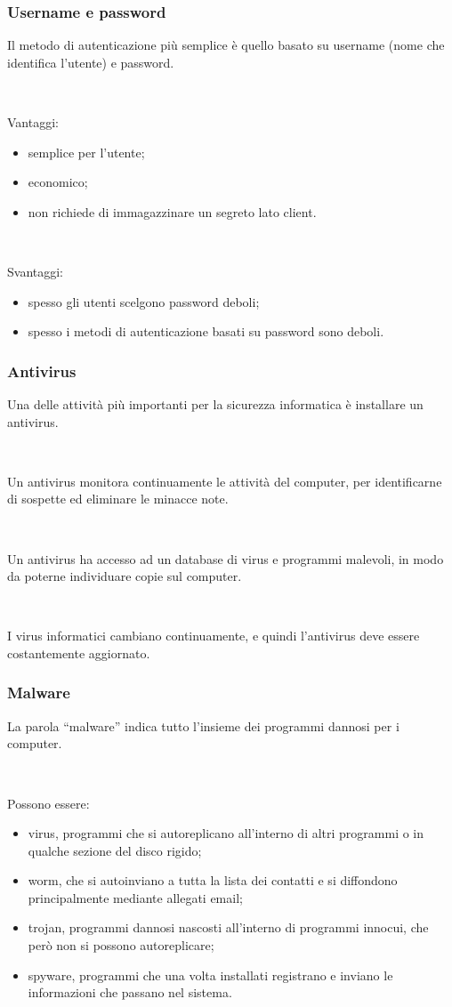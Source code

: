 \documentclass[]{beamer}
\begin{document}
\begin{frame}
\frametitle{Username e password}
Il metodo di autenticazione più semplice è quello basato su username (nome che identifica l'utente) e password.\pause

~


Vantaggi:
\begin{itemize}
  \item semplice per l’utente;
  \item economico;
  \item non richiede di immagazzinare un segreto lato client.
\end{itemize}\pause

~

Svantaggi:
\begin{itemize}
  \item spesso gli utenti scelgono password deboli;
  \item spesso i metodi di autenticazione basati su password sono deboli.
\end{itemize}
\end{frame}




\begin{frame}
\frametitle{Antivirus}
Una delle attività più importanti per la sicurezza informatica è \alert<1>{installare un antivirus}.\pause

~

Un antivirus monitora continuamente le attività del computer, per identificarne di sospette ed eliminare le minacce note.\pause

~

Un antivirus ha accesso ad un database di virus e programmi malevoli, in modo da poterne individuare copie sul computer.\pause

~

I virus informatici cambiano continuamente, e quindi l'antivirus deve essere \alert<4>{costantemente aggiornato}.
\end{frame}



\begin{frame}
\frametitle{Malware}
La parola ``malware'' indica tutto l'insieme dei programmi dannosi per i computer.{\pause}

~

Possono essere:
\begin{itemize}
   \item \alert<2>{virus}, programmi che si autoreplicano all'interno di altri programmi o in qualche sezione del disco rigido;\pause
   \item \alert<3>{worm}, che si autoinviano a tutta la lista dei contatti e si diffondono principalmente mediante allegati email;\pause
   \item \alert<4>{trojan}, programmi dannosi nascosti all'interno di programmi innocui, che però non si possono autoreplicare;\pause
   \item \alert<5>{spyware}, programmi che una volta installati registrano e inviano le informazioni che passano nel sistema.
\end{itemize}
\end{frame}
\end{document}
